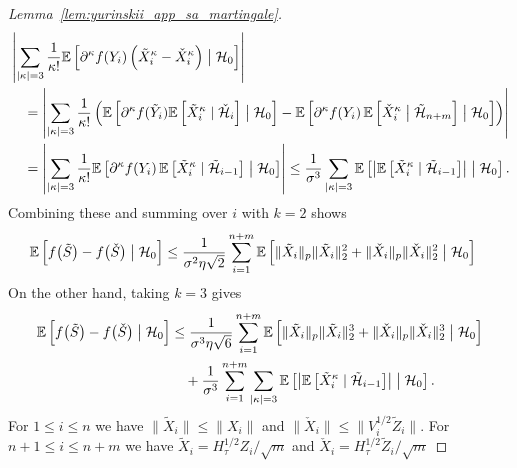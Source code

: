\begin{proof}[Lemma~\ref{lem:yurinskii_app_sa_martingale}]
\begin{align*}
    &
    \left|
    \sum_{|\kappa| = 3}
    \frac{1}{\kappa!}
    \mathbb{E} \left[
      \partial^\kappa f(Y_i)
      \left( \tilde X_i^\kappa - \check X_i^\kappa \right)
      \bigm| \mathcal{H}_0
    \right]
    \right|
    \\
    &\quad=
    \left|
    \sum_{|\kappa| = 3}
    \frac{1}{\kappa!}
    \left(
      \mathbb{E} \left[
        \partial^\kappa f(\tilde Y_i)
        \mathbb{E} \left[ \tilde X_i^\kappa \mid \check {\mathcal{H}}_i \right]
        \bigm| \mathcal{H}_0
      \right]
      - \mathbb{E} \left[
        \partial^\kappa f(Y_i) \,
        \mathbb{E} \left[
          \check X_i^\kappa
          \bigm| \tilde {\mathcal{H}}_{n+m}
        \right]
        \bigm| \mathcal{H}_0
      \right]
    \right)
    \right|
    \\
    &\quad=
    \left|
    \sum_{|\kappa| = 3}
    \frac{1}{\kappa!}
    \mathbb{E} \left[
      \partial^\kappa f(Y_i) \,
      \mathbb{E} \left[ \tilde X_i^\kappa \mid \tilde {\mathcal{H}}_{i-1} \right]
      \bigm| \mathcal{H}_0
    \right]
    \right|
    \leq
    \frac{1}{\sigma^3}
    \sum_{|\kappa| = 3}
    \mathbb{E} \left[
      \left|
      \mathbb{E} \left[ \tilde X_i^\kappa \mid \tilde {\mathcal{H}}_{i-1} \right]
      \right|
      \bigm| \mathcal{H}_0
    \right].
  \end{align*}
  Combining these and summing over $i$ with $k=2$ shows
  \begin{align*}
    \mathbb{E}\left[
      f\big(\tilde S\big) - f\big(\check S\big)
      \bigm| \mathcal{H}_0
    \right]
    &\leq
    \frac{1}{\sigma^2 \eta \sqrt{2}}
    \sum_{i=1}^{n+m}
    \mathbb{E} \left[
      \|\tilde X_i\|_p \|\tilde X_i\|_2^2
      + \|\check X_i\|_p \|\check X_i\|_2^2
      \bigm| \mathcal{H}_0
    \right]
  \end{align*}
  On the other hand, taking $k = 3$ gives
  \begin{align*}
    \mathbb{E}\left[
      f\big(\tilde S\big) - f\big(\check S\big)
      \bigm| \mathcal{H}_0
    \right]
    &\leq
    \frac{1}{\sigma^3 \eta \sqrt{6}}
    \sum_{i=1}^{n+m}
    \mathbb{E} \left[
      \|\tilde X_i\|_p \|\tilde X_i\|_2^3
      + \|\check X_i\|_p \|\check X_i\|_2^3
      \bigm| \mathcal{H}_0
    \right] \\
    &\quad+
    \frac{1}{\sigma^3}
    \sum_{i=1}^{n+m}
    \sum_{|\kappa| = 3}
    \mathbb{E} \left[
      \left|
      \mathbb{E} \left[ \tilde X_i^\kappa \mid \tilde {\mathcal{H}}_{i-1} \right]
      \right|
      \bigm| \mathcal{H}_0
    \right].
  \end{align*}
  For $1 \leq i \leq n$ we have
  $\|\tilde X_i\| \leq \|X_i\|$
  and $\|\check X_i\| \leq \|V_i^{1/2} \tilde Z_i\|$.
  For $n+1 \leq i \leq n+m$ we have
  $\tilde X_i = H_\tau^{1/2} Z_i / \sqrt m$
  and $\check X_i = H_\tau^{1/2} \tilde Z_i / \sqrt m$

\end{proof}
